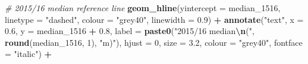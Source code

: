 \documentclass[
]{article}
\newenvironment{Shaded}{\begin{snugshade}}{\end{snugshade}}
\newcommand{\AttributeTok}[1]{\textcolor[rgb]{0.13,0.29,0.53}{#1}}
\newcommand{\CommentTok}[1]{\textcolor[rgb]{0.56,0.35,0.01}{\textit{#1}}}
\newcommand{\DecValTok}[1]{\textcolor[rgb]{0.00,0.00,0.81}{#1}}
\newcommand{\FloatTok}[1]{\textcolor[rgb]{0.00,0.00,0.81}{#1}}
\newcommand{\FunctionTok}[1]{\textcolor[rgb]{0.13,0.29,0.53}{\textbf{#1}}}
\newcommand{\NormalTok}[1]{#1}
\newcommand{\SpecialCharTok}[1]{\textcolor[rgb]{0.81,0.36,0.00}{\textbf{#1}}}
\newcommand{\StringTok}[1]{\textcolor[rgb]{0.31,0.60,0.02}{#1}}
\begin{document}
\begin{Shaded}
\begin{Highlighting}[]
  \CommentTok{\# 2015/16 median reference line}
  \FunctionTok{geom\_hline}\NormalTok{(}\AttributeTok{yintercept =}\NormalTok{ median\_1516,}
             \AttributeTok{linetype =} \StringTok{"dashed"}\NormalTok{,}
             \AttributeTok{colour   =} \StringTok{"grey40"}\NormalTok{,}
             \AttributeTok{linewidth =} \FloatTok{0.9}\NormalTok{) }\SpecialCharTok{+}
  \FunctionTok{annotate}\NormalTok{(}\StringTok{"text"}\NormalTok{,}
           \AttributeTok{x    =} \FloatTok{0.6}\NormalTok{,}
           \AttributeTok{y    =}\NormalTok{ median\_1516 }\SpecialCharTok{+} \FloatTok{0.8}\NormalTok{,}
           \AttributeTok{label =} \FunctionTok{paste0}\NormalTok{(}\StringTok{"2015/16 median}\SpecialCharTok{\textbackslash{}n}\StringTok{("}\NormalTok{, }\FunctionTok{round}\NormalTok{(median\_1516, }\DecValTok{1}\NormalTok{), }\StringTok{"m)"}\NormalTok{),}
           \AttributeTok{hjust    =} \DecValTok{0}\NormalTok{,}
           \AttributeTok{size     =} \FloatTok{3.2}\NormalTok{,}
           \AttributeTok{colour   =} \StringTok{"grey40"}\NormalTok{,}
           \AttributeTok{fontface =} \StringTok{"italic"}\NormalTok{) }\SpecialCharTok{+}
  

\end{Highlighting}
\end{Shaded}
\end{document}
